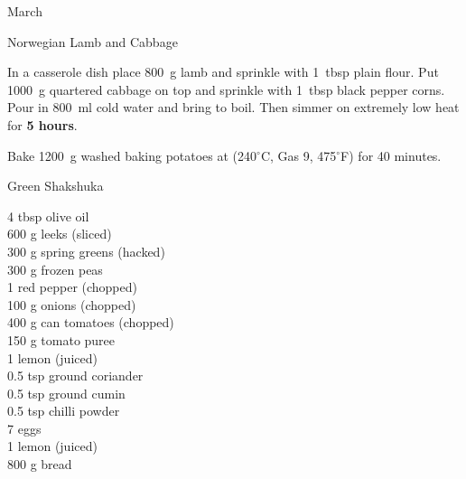 \begin{menu}{March}
\begin{recipe}{2}{Norwegian Lamb and Cabbage}
\begin{ingredients}
		\end{ingredients}
	
    \begin{instructions}
    \item 
        In a casserole dish place
        800~g  lamb
        and sprinkle with
        1~tbsp  plain flour.
        Put 
        1000~g quartered cabbage
        on top
        and sprinkle with
        1~tbsp  black pepper corns.
        Pour in 
        800~ml  cold water
        and bring to boil.
        Then simmer on extremely low heat for \textbf{5 hours}.
      \item 
      Bake 
      1200~g washed baking potatoes
      at
      (240$^{\circ}$C, Gas 9, 475$^{\circ}$F) for 40 minutes.
    
    \end{instructions}
    \end{recipe}%
  
    \begin{recipe}{2}{Green Shakshuka}%
		\begin{ingredients}
		4 tbsp olive oil  \\
	600 g leeks (sliced) \\
	300 g spring greens (hacked) \\
	300 g frozen peas  \\
	1  red pepper (chopped) \\
	100 g onions (chopped) \\
	400 g can tomatoes (chopped) \\
	150 g tomato puree  \\
	1  lemon (juiced) \\
	0.5 tsp ground coriander  \\
	0.5 tsp ground cumin  \\
	0.5 tsp chilli powder  \\
	7  eggs  \\
	1  lemon (juiced) \\
	800 g bread  \\
	
		\end{ingredients}
	

\end{recipe}
\end{menu}
